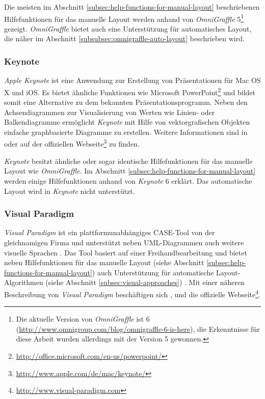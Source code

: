 Die meisten im Abschnitt \ref{subsec:help-functions-for-manual-layout} beschriebenen Hilfefunktionen für das manuelle Layout werden anhand von \textit{OmniGraffle} 5\footnote{Die aktuelle Version von \textit{OmniGraffle} ist 6 (\url{http://www.omnigroup.com/blog/omnigraffle-6-is-here}), die Erkenntnisse für diese Arbeit wurden allerdings mit der Version 5 gewonnen.} gezeigt. \textit{OmniGraffle} bietet auch eine Unterstützung für automatisches Layout, die näher im Abschnitt \ref{subsubsec:omnigraffle-auto-layout} beschrieben wird.

\subsubsection{Keynote}
\label{subsubsec:keynote}

\textit{Apple} \textit{Keynote} ist eine Anwendung zur Erstellung von Präsentationen für Mac OS X und iOS. Es bietet ähnliche Funktionen wie Microsoft PowerPoint\footnote{\url{http://office.microsoft.com/en-us/powerpoint/}} und bildet somit eine Alternative zu dem bekannten Präsentationsprogramm. Neben den Achsendiagrammen zur Visualisierung von Werten wie Linien- oder Balkendiagramme ermöglicht \textit{Keynote} mit Hilfe von vektorgrafischen Objekten einfache graphbasierte Diagramme zu erstellen. Weitere Informationen sind in \cite{11Keynote} oder auf der offiziellen Webseite\footnote{\url{http://www.apple.com/de/mac/keynote/}} zu finden. 

\textit{Keynote} besitzt ähnliche oder sogar identische Hilfefunktionen für das manuelle Layout wie \textit{OmniGraffle}. Im Abschnitt \ref{subsec:help-functions-for-manual-layout} werden einige Hilfefunktionen anhand von \textit{Keynote} 6 erklärt. Das automatische Layout wird in \textit{Keynote} nicht unterstützt.

\subsubsection{Visual Paradigm}
\label{subsubsec:visual-paradigm}

\textit{Visual Paradigm} ist ein plattformunabhängiges CASE-Tool von der gleichnamigen Firma und unterstützt neben UML-Diagrammen auch weitere visuelle Sprachen \cite{14Visual}. Das Tool basiert auf einer Freihandbearbeitung und bietet neben Hilfefunktionen für das manuelle Layout (siehe Abschnitt \ref{subsec:help-functions-for-manual-layout}) auch Unterstützung für automatische Layout-Algorithmen (siehe Abschnitt \ref{subsec:visual-approaches}) \cite{Fuhrmann11On-the-Pragmatics}. Mit einer näheren Beschreibung von \textit{Visual Paradigm} beschäftigen sich \cite{14Visual}, \cite[S.313-314]{Fuhrmann11On-the-Pragmatics} und die offizielle Webseite\footnote{\url{http://www.visual-paradigm.com}}.

